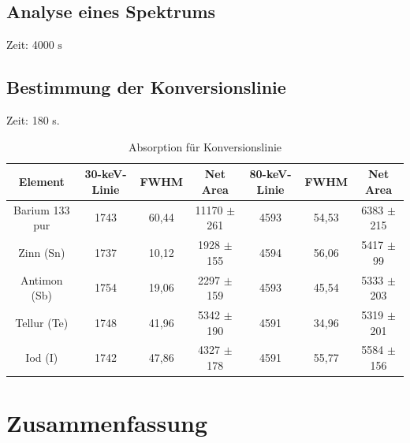 \documentclass[
	parskip=half,10pt,
	numbers= noenddot, %
	toc=flat, %
	oneside,
	twocolumn,
	]{scrartcl}
\begin{document}
\subsection{Analyse eines Spektrums}

Zeit: 4000 $\si{\second}$

\subsection{Bestimmung der Konversionslinie}

Zeit: 180 s.

\begin{table}[b]
\begin{tabular}{ccccccc}
 Element & 30-keV-Linie & FWHM & Net Area & 80-keV-Linie & FWHM & Net Area \\
 \hline
 Barium 133 pur & 1743 & 60,44 & 11170 $\pm$ 261 & 4593 & 54,53 & 6383 $\pm$ 215 \\
 Zinn (Sn)      & 1737 & 10,12 &  1928 $\pm$ 155 & 4594 & 56,06 & 5417 $\pm$  99 \\
 Antimon (Sb)   & 1754 & 19,06 &  2297 $\pm$ 159 & 4593 & 45,54 & 5333 $\pm$ 203 \\
 Tellur (Te)    & 1748 & 41,96 &  5342 $\pm$ 190 & 4591 & 34,96 & 5319 $\pm$ 201 \\
 Iod (I)        & 1742 & 47,86 &  4327 $\pm$ 178 & 4591 & 55,77 & 5584 $\pm$ 156 \\
\end{tabular}
\caption{Absorption für Konversionslinie}
\label{tab:konversion}
\end{table}

\section{Zusammenfassung}

\newpage


\end{document}
